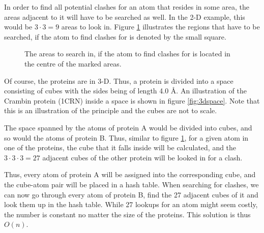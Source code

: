 \documentclass[a4paper]{article}
\begin{document}
In order to find all potential clashes for an atom that resides in some area, the areas adjacent to it will have to be searched as well. In the 2-D example, this would be $3 \cdot 3 = 9$ areas to look in. Figure \ref{fig:2dregionstosearch} illustrates the regions that have to be searched, if the atom to find clashes for is denoted by the small square.

\begin{figure}[H]
\centering
{}
\caption{The areas to search in, if the atom to find clashes for is located in the centre of the marked areas.}
\label{fig:2dregionstosearch}
\end{figure}

Of course, the proteins are in 3-D. Thus, a protein is divided into a space consisting of cubes with the sides being of length 4.0 Å. An illustration of the Crambin protein (1CRN) inside a space is shown in figure \ref{fig:3dspace}. Note that this is an illustration of the principle and the cubes are not to scale.

The space spanned by the atoms of protein A would be divided into cubes, and so would the atoms of protein B. Thus, similar to figure \ref{fig:2dregionstosearch}, for a given atom in one of the proteins, the cube that it falls inside will be calculated, and the $3 \cdot 3 \cdot 3 = 27$ adjacent cubes of the other protein will be looked in for a clash.

Thus, every atom of protein A will be assigned into the corresponding cube, and the cube-atom pair will be placed in a hash table. When searching for clashes, we can now go through every atom of protein B, find the 27 adjacent cubes of it and look them up in the hash table. While 27 lookups for an atom might seem costly, the number is constant no matter the size of the proteins. This solution is thus $O(n)$.
\end{document}
